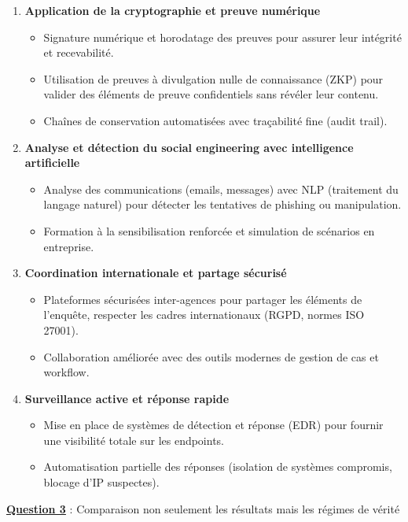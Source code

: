 \documentclass[12pt, a4paper]{article}
\newcommand{\question}[1]{\textbf{\underline{Question #1}}}
\begin{document}
\begin{enumerate}[label=\textbf{\arabic*.}, start=6]
\begin{enumerate}
			\item \textbf{Application de la cryptographie et preuve numérique}
			\begin{itemize}
				\item Signature numérique et horodatage des preuves pour assurer leur intégrité et recevabilité.
				\item Utilisation de preuves à divulgation nulle de connaissance (ZKP) pour valider des éléments de preuve confidentiels sans révéler leur contenu.
				\item Chaînes de conservation automatisées avec traçabilité fine (audit trail).
			\end{itemize}
			
			\item \textbf{Analyse et détection du social engineering avec intelligence artificielle}
			\begin{itemize}
				\item Analyse des communications (emails, messages) avec NLP (traitement du langage naturel) pour détecter les tentatives de phishing ou manipulation.
				\item Formation à la sensibilisation renforcée et simulation de scénarios en entreprise.
			\end{itemize}
			
			\item \textbf{Coordination internationale et partage sécurisé}
			\begin{itemize}
				\item Plateformes sécurisées inter-agences pour partager les éléments de l'enquête, respecter les cadres internationaux (RGPD, normes ISO 27001).
				\item Collaboration améliorée avec des outils modernes de gestion de cas et workflow.
			\end{itemize}
			
			\item \textbf{Surveillance active et réponse rapide}
			\begin{itemize}
				\item Mise en place de systèmes de détection et réponse (EDR) pour fournir une visibilité totale sur les endpoints.
				\item Automatisation partielle des réponses (isolation de systèmes compromis, blocage d'IP suspectes).
			\end{itemize}
		\end{enumerate}
		
		\question{3} : Comparaison non seulement les résultats mais les régimes de vérité
		

\end{enumerate}
\end{document}
